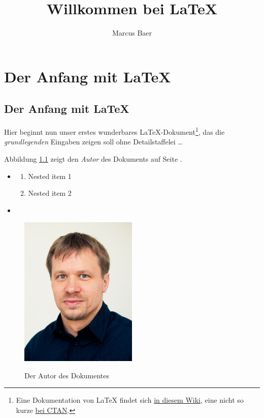 \documentclass[12pt, a5paper]{book}
\date{}
\begin{document}
\title{\textbf{Willkommen bei \LaTeX}}
\author{Marcus Baer}

\maketitle

\chapter{Der Anfang mit \LaTeX}

\section{Der Anfang mit \LaTeX}

Hier beginnt nun unser erstes wunderbares \LaTeX-Dokument\footnote{Eine Dokumentation von {\LaTeX} findet sich \href{https://en.wikibooks.org/wiki/LaTeX}{in diesem Wiki}, eine nicht so kurze \href{https://ctan.org/tex-archive/info/lshort/english/}{bei CTAN}.},
das die \textsl{grundlegenden} Eingaben zeigen soll ohne Detailstaffelei \dots

Abbildung \ref{fig:autor} zeigt den \emph{Autor} des Dokuments auf Seite \pageref{fig:autor}.

\begin{itemize}
\item \blindtext
\begin{enumerate}
\item Nested item 1
\item Nested item 2
\end{enumerate}
\item \blindtext
\end{itemize}

\begin{figure}
  \centering
    \href{http://www.marcusbaer.info}{
        \includegraphics[width=0.5\textwidth]{Marcus}
    }
    \caption{Der Autor des Dokumentes}
    \label{fig:autor}
\end{figure}
\end{document}
